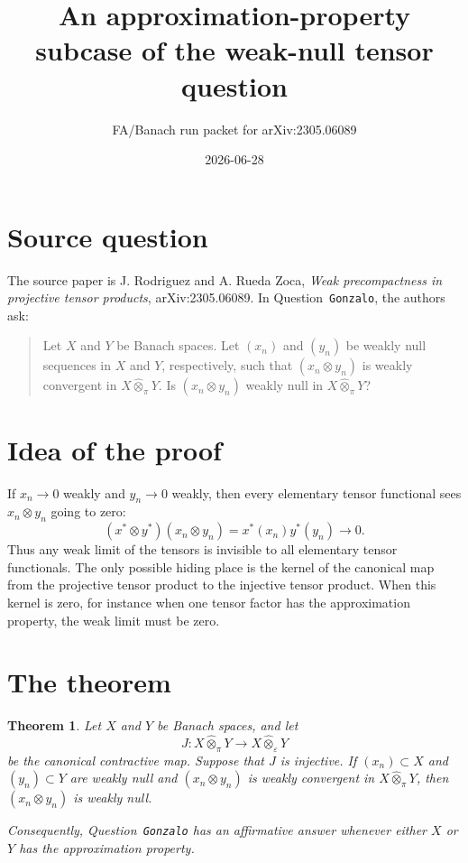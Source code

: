 \documentclass[11pt]{article}
\title{An approximation-property subcase of the weak-null tensor question}
\author{FA/Banach run packet for arXiv:2305.06089}
\date{2026-06-28}
\newtheorem{theorem}{Theorem}
\newcommand{\pten}{\widehat{\otimes}_{\pi}}
\newcommand{\eten}{\widehat{\otimes}_{\varepsilon}}
\begin{document}
\maketitle

\section*{Source question}

The source paper is J. Rodriguez and A. Rueda Zoca, \emph{Weak precompactness in projective tensor products}, arXiv:2305.06089.  In Question~\texttt{Gonzalo}, the authors ask:

\begin{quote}
Let \(X\) and \(Y\) be Banach spaces. Let \((x_n)\) and \((y_n)\) be weakly null sequences in \(X\) and \(Y\), respectively, such that \((x_n\otimes y_n)\) is weakly convergent in \(X\pten Y\). Is \((x_n\otimes y_n)\) weakly null in \(X\pten Y\)?
\end{quote}

\section*{Idea of the proof}

If \(x_n\to0\) weakly and \(y_n\to0\) weakly, then every elementary tensor functional sees \(x_n\otimes y_n\) going to zero:
\[
  (x^*\otimes y^*)(x_n\otimes y_n)=x^*(x_n)y^*(y_n)\to0.
\]
Thus any weak limit of the tensors is invisible to all elementary tensor functionals.  The only possible hiding place is the kernel of the canonical map from the projective tensor product to the injective tensor product.  When this kernel is zero, for instance when one tensor factor has the approximation property, the weak limit must be zero.

\section*{The theorem}

\begin{theorem}
\label{thm:injective-kernel}
Let \(X\) and \(Y\) be Banach spaces, and let
\[
  J:X\pten Y\longrightarrow X\eten Y
\]
be the canonical contractive map.  Suppose that \(J\) is injective.  If \((x_n)\subset X\) and \((y_n)\subset Y\) are weakly null and \((x_n\otimes y_n)\) is weakly convergent in \(X\pten Y\), then \((x_n\otimes y_n)\) is weakly null.

Consequently, Question~\texttt{Gonzalo} has an affirmative answer whenever either \(X\) or \(Y\) has the approximation property.
\end{theorem}
\end{document}
